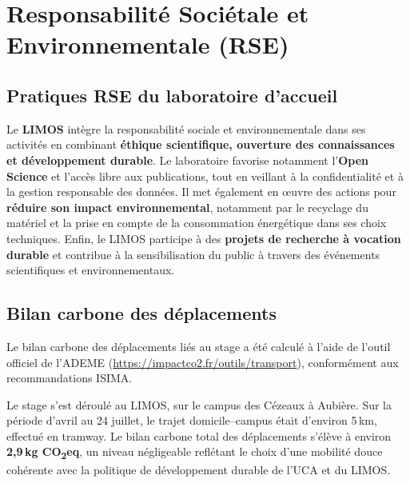 \documentclass[11pt,a4paper]{article}
\begin{document}
\section{Responsabilité Sociétale et Environnementale (RSE)}
\label{sec:rse}

\subsection{Pratiques RSE du laboratoire d'accueil}

Le \textbf{LIMOS} intègre la responsabilité sociale et environnementale dans ses activités en combinant \textbf{éthique scientifique, ouverture des connaissances et développement durable}. Le laboratoire favorise notamment l'\textbf{Open Science} et l'accès libre aux publications, tout en veillant à la confidentialité et à la gestion responsable des données. Il met également en œuvre des actions pour \textbf{réduire son impact environnemental}, notamment par le recyclage du matériel et la prise en compte de la consommation énergétique dans ses choix techniques. Enfin, le LIMOS participe à des \textbf{projets de recherche à vocation durable} et contribue à la sensibilisation du public à travers des événements scientifiques et environnementaux.

\subsection{Bilan carbone des déplacements}
\label{sec:bilan-carbone}

Le bilan carbone des déplacements liés au stage a été calculé à l'aide de l'outil officiel de l'ADEME (\url{https://impactco2.fr/outils/transport}), conformément aux recommandations ISIMA.

Le stage s'est déroulé au LIMOS, sur le campus des Cézeaux à Aubière. Sur la période d'avril au 24 juillet, le trajet domicile--campus était d'environ 5\,km, effectué en tramway. Le bilan carbone total des déplacements s'élève à environ \textbf{2,9\,kg CO\textsubscript{2}eq}, un niveau négligeable reflétant le choix d'une mobilité douce cohérente avec la politique de développement durable de l'UCA et du LIMOS.


\end{document}
